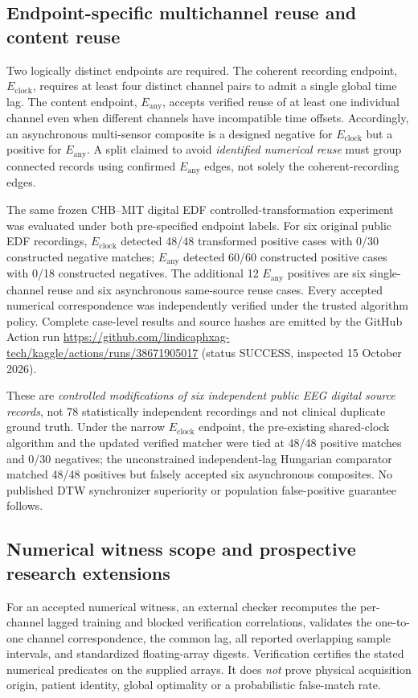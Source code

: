 \subsection{Endpoint-specific multichannel reuse and content reuse}
Two logically distinct endpoints are required. The coherent recording
endpoint, $E_{\mathrm{clock}}$, requires at least four distinct
channel pairs to admit a single global time lag. The content
endpoint, $E_{\mathrm{any}}$, accepts verified reuse of at least one
individual channel even when different channels have incompatible
time offsets. Accordingly, an asynchronous multi-sensor composite
is a designed negative for $E_{\mathrm{clock}}$ but a positive for
$E_{\mathrm{any}}$. A split claimed to avoid \emph{identified numerical
reuse} must group connected records using confirmed
$E_{\mathrm{any}}$ edges, not solely the coherent-recording edges.

The same frozen CHB--MIT digital EDF controlled-transformation
experiment was evaluated under both pre-specified endpoint labels.
For six original public EDF recordings, $E_{\mathrm{clock}}$
detected 48/48 transformed positive cases with 0/30 constructed
negative matches; $E_{\mathrm{any}}$ detected 60/60 constructed
positive cases with 0/18 constructed negatives. The additional
12 $E_{\mathrm{any}}$ positives are six single-channel reuse and
six asynchronous same-source reuse cases. Every accepted numerical
correspondence was independently verified under the trusted
algorithm policy. Complete case-level results and source hashes
are emitted by the GitHub Action run
\url{https://github.com/lindicaphxag-tech/kaggle/actions/runs/38671905017}
(status SUCCESS, inspected 15 October 2026).

These are \emph{controlled modifications of six independent
public EEG digital source records}, not 78 statistically independent
recordings and not clinical duplicate ground truth. Under the
narrow $E_{\mathrm{clock}}$ endpoint, the pre-existing
shared-clock algorithm and the updated verified matcher
were tied at 48/48 positive matches and 0/30 negatives;
the unconstrained independent-lag Hungarian comparator
matched 48/48 positives but falsely accepted six
asynchronous composites. No published DTW synchronizer
superiority or population false-positive guarantee follows.

\subsection{Numerical witness scope and prospective research extensions}
For an accepted numerical witness, an external checker recomputes
the per-channel lagged training and blocked verification
correlations, validates the one-to-one channel correspondence,
the common lag, all reported overlapping sample intervals,
and standardized floating-array digests. Verification certifies
the stated numerical predicates on the supplied arrays. It does
\emph{not} prove physical acquisition origin, patient identity,
global optimality or a probabilistic false-match rate.

